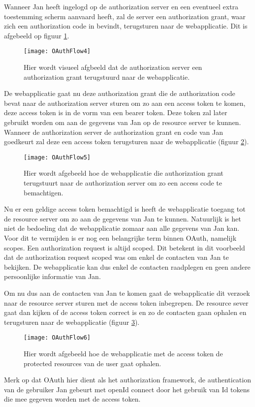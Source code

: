 Wanneer Jan heeft ingelogd op de authorization server en een eventueel extra toestemming scherm aanvaard heeft, zal de server een authorization grant, waar zich een authorization code in bevindt, terugsturen naar de webapplicatie. Dit is afgebeeld op figuur \ref{fig:oauth4}.
\begin{figure}[H]
	\centering
	\texttt{[image: OAuthFlow4]} 
	\caption[Authorization grant wordt teruggestuurd]{Hier wordt visueel afgbeeld dat de authorization server een authorization grant terugstuurd naar de webapplicatie.}
	\label{fig:oauth4}
\end{figure}
De webapplicatie gaat nu deze authorization grant die de authorization code bevat naar de authorization server sturen om zo aan een access token te komen, deze access token is in de vorm van een bearer token. Deze token zal later gebruikt worden om aan de gegevens van Jan op de resource server te kunnen. Wanneer de authorization server de authorization grant en code van Jan goedkeurt zal deze een access token terugsturen naar de webapplicatie (figuur \ref{fig:oauth5}).
\begin{figure}[H]
	\centering
	\texttt{[image: OAuthFlow5]} 
	\caption[Ophalen van de access code]{Hier wordt afgebeeld hoe de webapplicatie die authorization grant terugstuurt naar de authorization server om zo een access code te bemachtigen.}
	\label{fig:oauth5}
\end{figure}
Nu er een geldige access token bemachtigd is heeft de webapplicatie toegang tot de resource server om zo aan de gegevens van Jan te kunnen. Natuurlijk is het niet de bedoeling dat de webapplicatie zomaar aan alle gegevens van Jan kan. Voor dit te vermijden is er nog een belangrijke term binnen OAuth, namelijk scopes. Een authorization request is altijd scoped. Dit betekent in dit voorbeeld dat de authorization request scoped was om enkel de contacten van Jan te bekijken. De webapplicatie kan dus enkel de contacten raadplegen en geen andere persoonlijke informatie van Jan. 

Om nu dus aan de contacten van Jan te komen gaat de webapplicatie dit verzoek naar de resource server sturen met de access token inbegrepen. De resource sever gaat dan kijken of de access token correct is en zo de contacten gaan ophalen en terugsturen naar de webapplicatie (figuur \ref{fig:oauth6}).

\begin{figure}[H]
	\centering
	\texttt{[image: OAuthFlow6]} 
	\caption[Gebruik van access token voor ophalen protected resource]{Hier wordt afgebeeld hoe de webapplicatie met de access token de protected resources van de user gaat ophalen.}
	\label{fig:oauth6}
\end{figure}
Merk op dat OAuth hier dient als het authorization framework, de authentication van de gebruiker Jan gebeurt met openId connect door het gebruik van Id tokens die mee gegeven worden met de access token.

